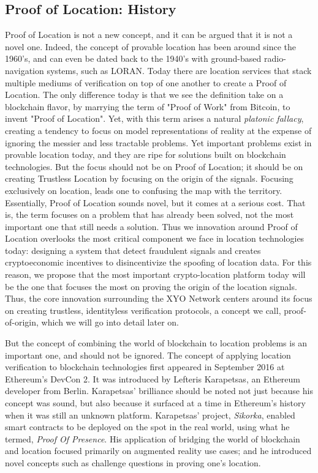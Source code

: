 \documentclass{article}
\begin{document}
\subsection {Proof of Location: History}
Proof of Location is not a new concept, and it can be argued that it is not a novel one. Indeed, the concept of provable location has been around since the 1960's, and can even be dated back to the 1940's with ground-based radio-navigation systems, such as LORAN. Today there are location services that stack multiple mediums of verification on top of one another to create a Proof of Location. The only difference today is that we see the definition take on a  blockchain flavor, by marrying the term of "Proof of Work" from Bitcoin, to invent "Proof of Location". Yet, with this term arises a natural \textit{platonic fallacy}, creating a tendency to focus on model representations of reality at the expense of ignoring the messier and less tractable problems. Yet important problems exist in provable location today, and they are ripe for solutions built on blockchain technologies. But the focus should not be on Proof of Location; it should be on creating Trustless Location by focusing on the origin of the signals. Focusing exclusively on location, leads one to confusing the map with the territory. Essentially, Proof of Location sounds novel, but it comes at a serious cost. That is, the term focuses on a problem that has already been solved, not the most important one that still needs a solution. Thus we innovation around Proof of Location overlooks the most critical component we face in location technologies today: designing a system that detect fraudulent signals and creates cryptoeconomic incentives to disincentivize the spoofing of location data. For this reason, we propose that the most important crypto-location platform today will be the one that focuses the most on proving the origin of the location signals. Thus, the core innovation surrounding the XYO Network centers around its focus on creating trustless, identityless verification protocols, a concept we call, \Gls{proof-of-origin}, which we will go into detail later on.

But the concept of combining the world of blockchain to location problems is an important one, and should not be ignored. The concept of applying location verification to blockchain technologies first appeared in September 2016 at Ethereum's DevCon 2. It was introduced by Lefteris Karapetsas, an Ethereum developer from Berlin. Karapetsas' brilliance should be noted not just because his concept was sound, but also because it surfaced at a time in Ethereum's history when it was still an unknown platform. Karapetsas' project, \textit{Sikorka}, enabled smart contracts to be deployed on the spot in the real world, using what he termed, \textit{Proof Of Presence}. His application of bridging the world of blockchain and location focused primarily on augmented reality use cases; and he introduced novel concepts such as challenge questions in proving one's location.
\end{document}
